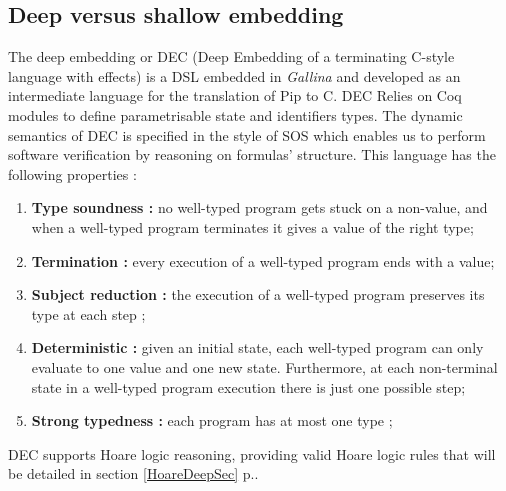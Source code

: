 \subsection{Deep versus shallow embedding}
The deep embedding or DEC (Deep Embedding of a
terminating C-style language with effects) is a \gls{DSL} embedded in \textit{Gallina} and developed as an intermediate language for
the translation of Pip to C. DEC Relies on Coq modules to define parametrisable state and identifiers types. The dynamic semantics of DEC is specified in the style of
\gls{SOS} which enables us to perform software verification by reasoning on formulas' structure.
This language has the following properties : 
\begin{enumerate}
	\item \textbf{Type soundness :} no well-typed program gets stuck on a
non-value, and when a well-typed program terminates it gives a value
of the right type;
	\item \textbf{Termination :} every execution of a well-typed program
ends with a value;
	\item \textbf{Subject reduction :} the execution of a well-typed
program preserves its type at each step ;
	\item \textbf{Deterministic  :} given an initial state, each well-typed
program can only evaluate to one value and one new state. Furthermore, at
each non-terminal state in a well-typed program execution there is
just one possible step;
	\item \textbf{Strong typedness :} each program has at most one
type ;	
\end{enumerate}
DEC supports Hoare logic reasoning, providing valid Hoare logic rules that will be detailed in section \ref{HoareDeepSec} p.\pageref{HoareDeepSec}.

